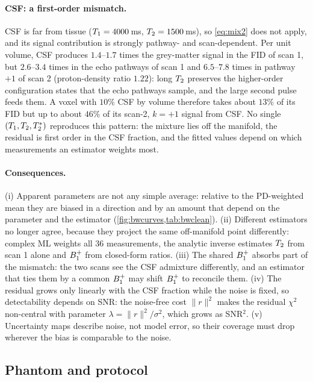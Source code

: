 \paragraph{CSF: a first-order mismatch.} CSF is far from tissue ($T_1=4000$\,ms, $T_2=1500$\,ms),
so \eqref{eq:mix2} does not apply, and its signal contribution is strongly pathway- and
scan-dependent. Per unit volume, CSF produces $1.4$--$1.7$ times the grey-matter signal in the
FID of scan 1, but $2.6$--$3.4$ times in the echo pathways of scan 1 and $6.5$--$7.8$ times in
pathway $+1$ of scan 2 (proton-density ratio $1.22$): long $T_2$ preserves the higher-order
configuration states that the echo pathways sample, and the large second pulse feeds them. A
voxel with $10\%$ CSF by volume therefore takes about $13\%$ of its FID but up to about $46\%$ of
its scan-2, $k=+1$ signal from CSF. No single $(T_1,T_2,T_2^{*})$ reproduces this pattern: the mixture
lies off the manifold, the residual is first order in the CSF fraction, and the fitted values
depend on which measurements an estimator weights most.

\paragraph{Consequences.} (i) Apparent parameters are not any simple average: relative to the
PD-weighted mean they are biased in a direction and by an amount that depend on the
parameter and the estimator (\cref{fig:bwcurves,tab:bwclean}). (ii) Different estimators no
longer agree, because they project the same off-manifold point differently: complex ML
weights all 36 measurements, the analytic inverse estimates $T_2$ from scan 1 alone and $B_1^{+}$
from closed-form ratios. (iii) The shared $B_1^{+}$ absorbs part of the mismatch: the two scans see
the CSF admixture differently, and an estimator that ties them by a common $B_1^{+}$ may shift
$B_1^{+}$ to reconcile them. (iv) The residual grows only linearly with the CSF fraction while the
noise is fixed, so detectability depends on SNR: the noise-free cost $\|r\|^2$ makes the
residual $\chi^2$ non-central with parameter $\lambda=\|r\|^2/\sigma^2$, which grows as SNR$^2$.
(v) Uncertainty maps describe noise, not model error, so their coverage must drop wherever
the bias is comparable to the noise.

\subsection{Phantom and protocol}

